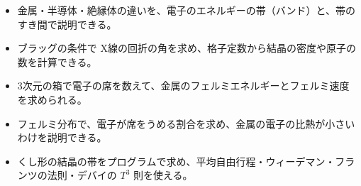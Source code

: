 \newcommand\txiatom[6]{\begin{scope}[shift={#1}]
  \filldraw[fill=#6, draw=bkInk, line width=0.4pt] ({#2*(#3+0.45*#5)},{#2*(#4+0.3*#5)}) circle (1.5);\end{scope}}
\makeatother


\begin{goal}
\begin{itemize}[label={\color{bkTheme}●}, leftmargin=1.6\zw, itemsep=0pt, topsep=1pt]
\item {}\enspace 金属・半導体・絶縁体の違いを、電子のエネルギーの帯（バンド）と、帯のすき間で説明できる。
\item {}\enspace ブラッグの条件で X線の回折の角を求め、格子定数から結晶の密度や原子の数を計算できる。
\item {}\enspace 3次元の箱で電子の席を数えて、金属のフェルミエネルギーとフェルミ速度を求められる。
\item {}\enspace フェルミ分布で、電子が席をうめる割合を求め、金属の電子の比熱が小さいわけを説明できる。
\item {}\enspace くし形の結晶の帯をプログラムで求め、平均自由行程・ウィーデマン・フランツの法則・デバイの $T^3$ 則を使える。
\end{itemize}
\end{goal}



